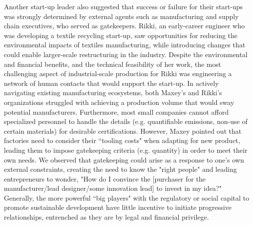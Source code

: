 Another start-up leader also suggested that success or failure for their start-ups was strongly determined by external agents such as manufacturing and supply chain executives, who served as gatekeepers. Rikki, an early-career engineer who was developing a textile recycling start-up, saw opportunities for reducing the environmental impacts of textiles manufacturing, while introducing changes that could enable larger-scale restructuring in the industry. Despite the environmental and financial benefits, and the technical feasibility of her work, the most challenging aspect of industrial-scale production for Rikki was engineering a network of human contacts that would support the start-up. In actively navigating existing manufacturing ecosystems, both Maxey's and Rikki's organizations struggled with achieving a production volume that would sway potential manufacturers. Furthermore, most small companies cannot afford specialized personnel to handle the details (e.g. quantifiable emissions, non-use of certain materials) for desirable certifications. However, Maxey pointed out that factories need to consider their ``tooling costs" when adapting for new product, leading them to impose gatekeeping criteria (e.g. quantity) in order to meet their own needs. We observed that gatekeeping could arise as a response to one's own external constraints, creating the need to know the "right people" and leading entrepreneurs to wonder, "How do I convince the [purchaser for the manufacturer/lead designer/some innovation lead] to invest in my idea?" Generally, the more powerful ``big players" with the regulatory or social capital to promote sustainable development have little incentive to initiate progressive relationships, entrenched as they are by legal and financial privilege.

